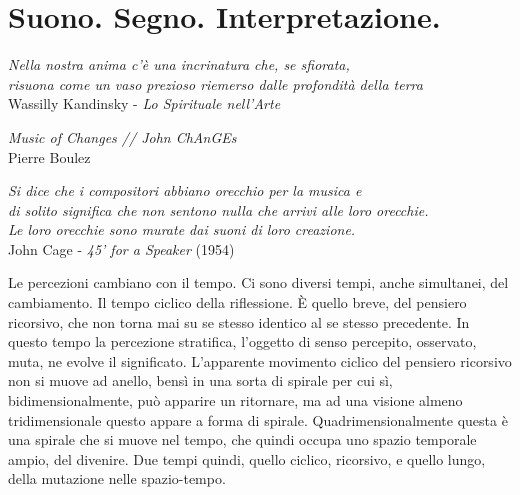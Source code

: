 

\chapter*{Suono. Segno. Interpretazione.}

	\begin{flushright}
		\textit{Nella nostra anima c'\`e una incrinatura che, se sfiorata, \\
		risuona come un vaso prezioso riemerso dalle profondit\`a della terra} \\
		Wassilly Kandinsky - \emph{Lo Spirituale nell'Arte}
	\end{flushright}

	\begin{flushright}
		\textit{Music of Changes // John ChAnGEs} \\
		Pierre Boulez
	\end{flushright}

	\begin{flushright}
		\textit{Si dice che i compositori abbiano orecchio per la musica e \\
		di solito significa che non sentono nulla che arrivi alle loro orecchie. \\
		Le loro orecchie sono murate dai suoni di loro creazione.} \\
		John Cage - \emph{45' for a Speaker} (1954)
	\end{flushright}

\bigskip


Le percezioni cambiano con il tempo. Ci sono diversi tempi, anche simultanei, del cambiamento.
Il tempo ciclico della riflessione. È quello breve, del pensiero ricorsivo, che non torna mai su se stesso identico al se stesso precedente.
In questo tempo la percezione stratifica, l'oggetto di senso percepito, osservato, muta, ne evolve il significato.
L'apparente movimento ciclico del pensiero ricorsivo non si muove ad anello, bensì in una sorta di spirale per cui sì, bidimensionalmente, può apparire un ritornare, ma ad una visione almeno tridimensionale questo appare a forma di spirale.
Quadrimensionalmente questa è una spirale che si muove nel tempo, che quindi occupa uno spazio temporale ampio, del divenire. Due tempi quindi, quello ciclico, ricorsivo, e quello lungo, della mutazione nelle spazio-tempo.

